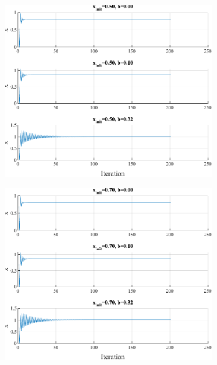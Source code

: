 \begin{figure}[htpb]
	\begin{subfigure}{0.47\textwidth}
		\includegraphics[width=\textwidth]{../Problem 3/prob3_(b)_x_init_0.50.pdf}
		\caption{}
	\end{subfigure}
	\begin{subfigure}{0.47\textwidth}
		\includegraphics[width=\textwidth]{../Problem 3/prob3_(b)_x_init_0.70.pdf}
		\caption{}
	\end{subfigure}\\[4mm]
	\begin{subfigure}{0.47\textwidth}

\end{subfigure}
\end{figure}
